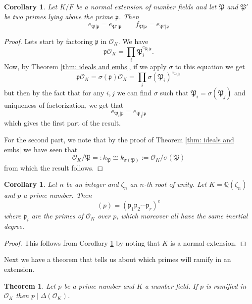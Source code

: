 \documentclass[11pt,a4paper]{report}
\theoremstyle{plain}
\newtheorem{theorem}[subsection]{Theorem}
\newtheorem{corollary}[subsection]{Corollary}
\theoremstyle{definition}
\theoremstyle{definition}
\def\QQ{\mathbb{Q}}
\def \gothP{\mathfrak{P}}
\def\gothp{\mathfrak{p}}
\def \s {\sigma}
\def \OO {\mathcal{O}}
\def \s {\sigma}
\begin{document}
	\begin{corollary}\label{cor: ram and inert in gal ext}
		Let $K/F$ be a normal extension of number fields and let $\gothP$ and $\gothP'$ be two primes lying above the prime $\gothp$. Then \[e_{\gothP|\gothp}=e_{\gothP'|\gothp} \qquad f_{\gothP|\gothp}=e_{\gothP'|\gothp}\]
	\end{corollary}
	
	\begin{proof}
		Lets start by factoring $\gothp$ in $\OO_K$.  We have \[\gothp \OO_K=\prod_i \gothP_i^{e_{\gothP_i|\gothp}}.\] Now, by Theorem \ref{thm: ideals and embs}, if we apply $\s$ to this equation we get \[\gothp\OO_K=\s(\gothp)\OO_K=\prod_i \s(\gothP_i)^{e_{\gothP_i|\gothp}}\] but then by the fact that for any $i,j$ we can find $\s$ such that $\gothP_i=\s(\gothP_j)$ and uniqueness of factorization, we get that \[e_{\gothP_i|\gothp}=e_{\gothP_j|\gothp}\] which gives the first part of the result. 
		
		For the second part, we note that by the proof of Theorem \ref{thm: ideals and embs} we have seen that \[\OO_K/\gothP=:k_{\gothP} \cong k_{\s(\gothP)}:=\OO_K/\s(\gothP)\] from which the result follows.
	\end{proof}
	
	
	\begin{corollary}
		Let $n$ be an integer and $\zeta_n$ an $n$-th root of unity. Let $K=\QQ(\zeta_n)$ and $p$ a prime number. Then \[(p)=(\gothp_1 \gothp_2\cdots \gothp_r)^e\] where $\gothp_i$ are the primes of $\OO_K$ over $p$, which moreover all have the same inertial degree.
	\end{corollary}
	
	\begin{proof}
		This follows from Corollary \ref{cor: ram and inert in gal ext} by noting that $K$ is a normal extension.
	\end{proof}
	
	Next we have a theorem that tells us about which primes will ramify in an extension.
	
	\begin{theorem}\label{thm: ram primes div disc}
		Let $p$ be a prime number and $K$ a number field. If $p$ is ramified in $\OO_K$ then $p \mid \Delta(\OO_K)$.
	\end{theorem}
	
\end{document}
